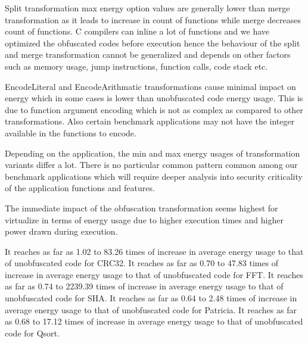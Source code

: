 
Split transformation max energy option values are generally lower than merge transformation as it leads to increase in count of functions while merge decreases count of functions. C compilers can inline a lot of functions and we have optimized the obfuscated codes before execution hence the behaviour of the split and merge transformation cannot be generalized and depends on other factors such as memory usage, jump instructions, function calls,  code stack etc.


EncodeLiteral and EncodeArithmatic transformations cause minimal impact on energy which in some cases is lower than unobfuscated code energy usage. This is due to function argument encoding which is not as complex as compared to other transformations. Also certain benchmark applications may not have the integer available in the functions to encode.


Depending on the application, the min and max energy usages of transformation variants differ a lot. There is no particular  common pattern common among our benchmark applications which will require deeper analysis into security criticality of the application functions and features.

The immediate impact of the obfuscation transformation seems highest for virtualize in terms of energy usage due to higher execution times and higher power drawn during execution.

It reaches as far as 1.02 to 83.26 times of increase in average energy usage to that of unobfuscated code for CRC32. 
It reaches as far as 0.70 to 47.83 times of increase in average energy usage to that of unobfuscated code for FFT.
It reaches as far as 0.74 to 2239.39 times of increase in average energy usage to that of unobfuscated code for SHA.
It reaches as far as 0.64 to 2.48 times of increase in average energy usage to that of unobfuscated code for Patricia.
It reaches as far as 0.68 to 17.12 times of increase in average energy usage to that of unobfuscated code for Qsort.





